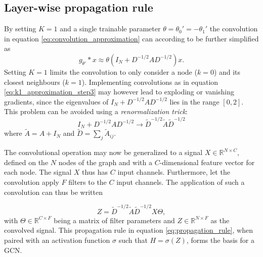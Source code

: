 \subsection{Layer-wise propagation rule}
By setting $K = 1$ and a single trainable parameter $\theta = \theta_0' = -\theta_1'$ the convolution in equation \eqref{eq:convolution_approximation} can according to \cite{kipf_semi_supervised} be further simplified as 
\begin{equation}
    g_{\theta'} * x \approx \theta \left(I_N + D^{-1/2}AD^{-1/2} \right)x. 
    \label{eq:k1_approximation_step3}
\end{equation}
Setting $K=1$ limits the convolution to only consider a node ($k=0$) and its closest neighbours ($k=1$). Implementing convolutions as in equation \eqref{eq:k1_approximation_step3} may however lead to exploding or vanishing gradients, since the eigenvalues of $I_N + D^{-1/2}AD^{-1/2}$ lies in the range $[0, 2]$. This problem can be avoided using a \textit{renormalization trick}:
\begin{equation}
    I_N + D^{-1/2}AD^{-1/2} \rightarrow \tilde{D}^{-1/2} \tilde{A} \tilde{D}^{-1/2}
    \label{eq:renormalization_trick}
\end{equation}
where $\tilde{A} = A + I_N$ and $\tilde{D} = \sum_j \tilde{A}_{ij}$.

The convolutional operation may now be generalized to a signal $X \in \mathbb{R}^{N \times C}$, defined on the $N$ nodes of the graph and with a $C$-dimensional feature vector for each node. The signal $X$ thus has $C$ input channels. Furthermore, let the convolution apply $F$ filters to the $C$ input channels. The application of such a convolution can thus be written

\begin{equation}
    Z = \tilde{D}^{-1/2} \tilde{A} \tilde{D}^{-1/2} X \Theta,
    \label{eq:propagation_rule}
\end{equation}
with $\Theta \in \mathbb{R}^{C\times F}$ being a matrix of filter parameters and $Z \in \mathbb{R}^{N\times F}$ as the convolved signal. This propagation rule in equation \eqref{eq:propagation_rule}, when paired with an activation function $\sigma$ such that $H = \sigma\left(Z \right)$, forms the basis for a GCN. 

